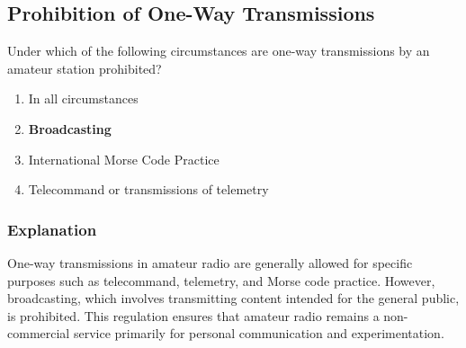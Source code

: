 \subsection{Prohibition of One-Way Transmissions}
\label{T1D02}

\begin{tcolorbox}[colback=gray!10!white,colframe=black!75!black,title=T1D02]
Under which of the following circumstances are one-way transmissions by an amateur station prohibited?
\begin{enumerate}[label=\Alph*),noitemsep]
    \item In all circumstances
    \item \textbf{Broadcasting}
    \item International Morse Code Practice
    \item Telecommand or transmissions of telemetry
\end{enumerate}
\end{tcolorbox}

\subsubsection*{Explanation}
One-way transmissions in amateur radio are generally allowed for specific purposes such as telecommand, telemetry, and Morse code practice. However, broadcasting, which involves transmitting content intended for the general public, is prohibited. This regulation ensures that amateur radio remains a non-commercial service primarily for personal communication and experimentation.